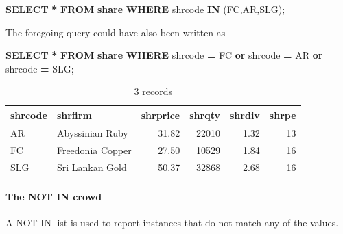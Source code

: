 \documentclass[
]{article}
\newenvironment{Shaded}{\begin{snugshade}}{\end{snugshade}}
\newcommand{\KeywordTok}[1]{\textcolor[rgb]{0.13,0.29,0.53}{\textbf{#1}}}
\newcommand{\NormalTok}[1]{#1}
\newcommand{\OperatorTok}[1]{\textcolor[rgb]{0.81,0.36,0.00}{\textbf{#1}}}
\newcommand{\StringTok}[1]{\textcolor[rgb]{0.31,0.60,0.02}{#1}}
\begin{document}
\begin{Shaded}
\begin{Highlighting}[]
\KeywordTok{SELECT} \OperatorTok{*} \KeywordTok{FROM} \KeywordTok{share} \KeywordTok{WHERE}\NormalTok{ shrcode }\KeywordTok{IN}\NormalTok{ (}\StringTok{\textquotesingle{}FC\textquotesingle{}}\NormalTok{,}\StringTok{\textquotesingle{}AR\textquotesingle{}}\NormalTok{,}\StringTok{\textquotesingle{}SLG\textquotesingle{}}\NormalTok{);}
\end{Highlighting}
\end{Shaded}

The foregoing query could have also been written as

\begin{Shaded}
\begin{Highlighting}[]
\KeywordTok{SELECT} \OperatorTok{*} \KeywordTok{FROM} \KeywordTok{share}
  \KeywordTok{WHERE}\NormalTok{ shrcode }\OperatorTok{=} \StringTok{\textquotesingle{}FC\textquotesingle{}} \KeywordTok{or}\NormalTok{ shrcode }\OperatorTok{=} \StringTok{\textquotesingle{}AR\textquotesingle{}} \KeywordTok{or}\NormalTok{ shrcode }\OperatorTok{=} \StringTok{\textquotesingle{}SLG\textquotesingle{}}\NormalTok{;}
\end{Highlighting}
\end{Shaded}

\begin{table}

\caption{\label{tab:unnamed-chunk-14}3 records}
\centering
\begin{tabular}[t]{l|l|r|r|r|r}
\hline
shrcode & shrfirm & shrprice & shrqty & shrdiv & shrpe\\
\hline
AR & Abyssinian Ruby & 31.82 & 22010 & 1.32 & 13\\
\hline
FC & Freedonia Copper & 27.50 & 10529 & 1.84 & 16\\
\hline
SLG & Sri Lankan Gold & 50.37 & 32868 & 2.68 & 16\\
\hline
\end{tabular}
\end{table}

\hypertarget{the-not-in-crowd}{%
\paragraph*{The NOT IN crowd}\label{the-not-in-crowd}}

A NOT IN list is used to report instances that do not match any of the values.
\end{document}
